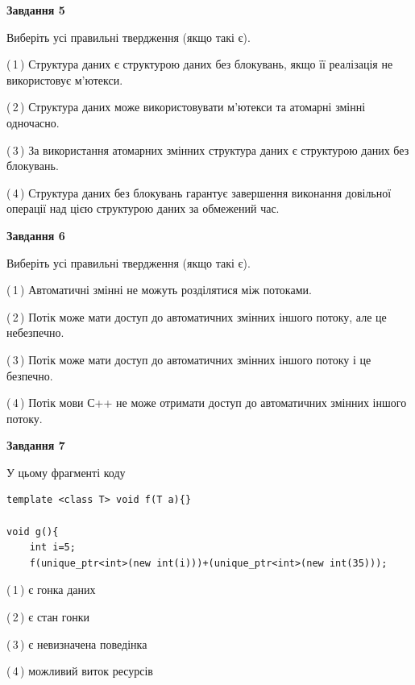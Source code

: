 \documentclass[12pt, ukrainian]{article}
\begin{document}
\begin {large}
{\begin{center}
\textbf{Завдання 5}
\end{center}

Виберіть усі правильні твердження (якщо такі є).\par
\vspace{2mm}

(\,1\,) Структура даних є структурою даних без блокувань, якщо її реалізація не використовує м’ютекси.%

(\,2\,) Структура даних може використовувати м’ютекси та атомарні змінні одночасно.%

(\,3\,) За використання атомарних змінних структура даних є структурою даних без блокувань.%

(\,4\,) Структура даних без блокувань гарантує завершення виконання довільної операції над цією структурою даних за обмежений час.%
\newpage


\begin{center}
\textbf{Завдання 6}
\end{center}

Виберіть усі правильні твердження (якщо такі є).\par
\vspace{2mm}

(\,1\,) Автоматичні змінні не можуть розділятися між потоками.%

(\,2\,) Потік може мати доступ до автоматичних змінних іншого потоку, але це небезпечно.%

(\,3\,) Потік може мати доступ до автоматичних змінних іншого потоку і це безпечно.%

(\,4\,) Потік мови С++ не може отримати доступ до автоматичних змінних іншого потоку.%


\begin{center}
\textbf{Завдання 7}
\end{center}

У цьому фрагменті коду
\begin{verbatim}
template <class T> void f(T a){}

void g(){
    int i=5;
    f(unique_ptr<int>(new int(i)))+(unique_ptr<int>(new int(35)));
\end{verbatim}
(\,1\,) є гонка даних%

(\,2\,) є стан гонки%

(\,3\,) є невизначена поведінка%

(\,4\,) можливий виток ресурсів%

}
\end {large}

\vspace{4mm}
\newpage
\end{document}

